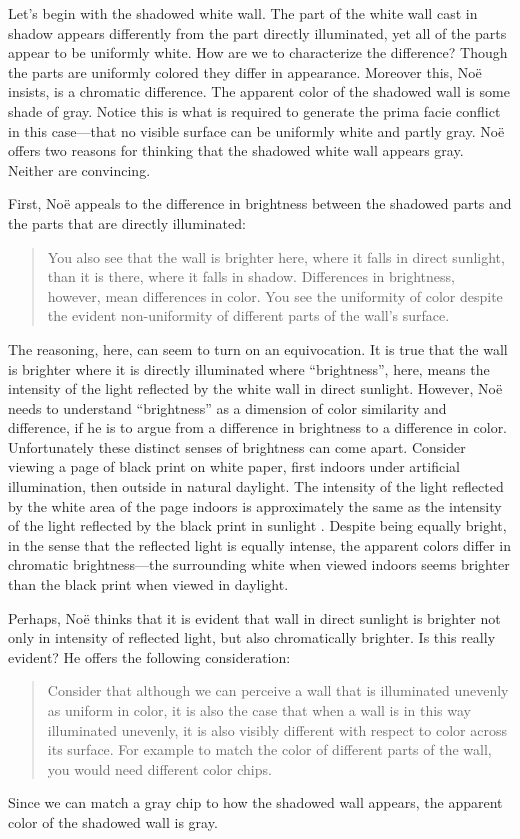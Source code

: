 \documentclass[12pt]{article}
\begin{document}
Let's begin with the shadowed white wall. The part of the white wall cast in shadow appears differently from the part directly illuminated, yet all of the parts appear to be uniformly white. How are we to characterize the difference? Though the parts are uniformly colored they differ in appearance. Moreover this, Noë insists, is a chromatic difference. The apparent color of the shadowed wall is some shade of gray. Notice this is what is required to generate the prima facie conflict in this case---that no visible surface can be uniformly white and partly gray. Noë offers two reasons for thinking that the shadowed white wall appears gray. Neither are convincing.

First, Noë appeals to the difference in brightness between the shadowed parts and the parts that are directly illuminated:
	\begin{quote}
		You also see that the wall is brighter here, where it falls in direct sunlight, than it is there, where it falls in shadow. Differences in brightness, however, mean differences in color. You see the uniformity of color despite the evident non-uniformity of different parts of the wall's surface. \citep[127]{Noe:2004fk}
	\end{quote}
The reasoning, here, can seem to turn on an equivocation. It is true that the wall is brighter where it is directly illuminated where ``brightness'', here, means the intensity of the light reflected by the white wall in direct sunlight. However, Noë needs to understand ``brightness'' as a dimension of color similarity and difference, if he is to argue from a difference in brightness to a difference in color. Unfortunately these distinct senses of brightness can come apart. Consider viewing a page of black print on white paper, first indoors under artificial illumination, then outside in natural daylight. The intensity of the light reflected by the white area of the page indoors is approximately the same as the intensity of the light reflected by the black print in sunlight \citep[199]{Peter-K:1996th}. Despite being equally bright, in the sense that the reflected light is equally intense, the apparent colors differ in chromatic brightness---the surrounding white when viewed indoors seems brighter than the black print when viewed in daylight.

Perhaps, Noë thinks that it is evident that wall in direct sunlight is brighter not only in intensity of reflected light, but also chromatically brighter. Is this really evident? He offers the following consideration:
	\begin{quote}
		Consider that although we can perceive a wall that is illuminated unevenly as uniform in color, it is also the case that when a wall is in this way illuminated unevenly, it is also visibly different with respect to color across its surface. For example to match the color of different parts of the wall, you would need different color chips. \citep[128]{Noe:2004fk}
	\end{quote}
Since we can match a gray chip to how the shadowed wall appears, the apparent color of the shadowed wall is gray. 
\end{document}
